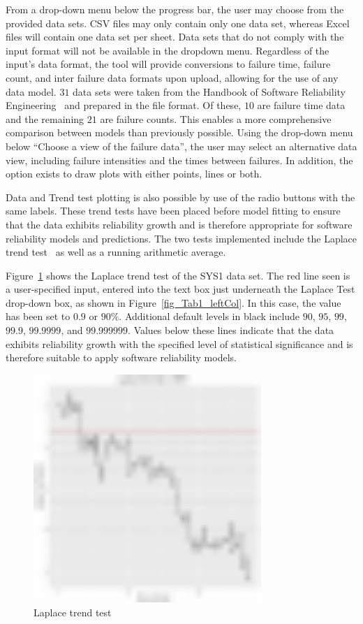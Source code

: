 \documentclass[conference]{IEEEtran}
\begin{document}
From a drop-down menu below the progress bar, the user may choose from the provided data sets. CSV files may only contain only one data set, whereas Excel files will contain one data set per sheet. Data sets that do not comply with the input format will not be available in the dropdown menu. Regardless of the input's data format, the tool will provide conversions to failure time, failure count, and inter failure data formats upon upload, allowing for the use of any data model. $31$ data sets were taken from the Handbook of Software Reliability Engineering~\cite{BookHoSRE} and prepared in the file format. Of these, $10$ are failure time data and the remaining $21$ are failure counts. This enables a more comprehensive comparison between models than previously possible. Using the drop-down menu below ``Choose a view of the failure data'', the user may select an alternative data view, including failure intensities and the times between failures. In addition, the option exists to draw plots with either points, lines or both.

Data and Trend test plotting is also possible by use of the radio buttons with the same labels. These trend tests have been placed before model fitting to ensure that the data exhibits reliability growth and is therefore appropriate for software reliability models and predictions. The two tests implemented include the Laplace trend test~\cite{gaudoin1992optimal} as well as a running arithmetic average.

Figure~\ref{fig_Tab1_Laplace} shows the Laplace trend test of the SYS1 data set. The red line seen is a user-specified input, entered into the text box just underneath the Laplace Test drop-down box, as shown in Figure~\ref{fig_Tab1_leftCol}. In this case, the value has been set to $0.9$ or $90\%$. Additional default levels in black include $90$, $95$, $99$, $99.9$, $99.9999$, and $99.999999$. Values below these lines indicate that the data exhibits reliability growth with the specified level of statistical significance and is therefore suitable to apply software reliability models.

\begin{figure}[!h]
\centering
\includegraphics[width=3.4in]{Figures/SRT3}
\caption{Laplace trend test}
\label{fig_Tab1_Laplace}
\end{figure}
\end{document}
